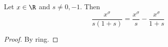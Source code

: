 \begin{lemma}[keyIdentity]
\label{keyIdentity}
\leanok
Let $x\in \R$ and $s \ne 0, -1$. Then
  $$
  \frac{x^\sigma}{s(1+s)} = \frac{x^\sigma}{s} - \frac{x^\sigma}{1+s}
  $$
\end{lemma}
\begin{proof}
\leanok
By ring.
\end{proof}
